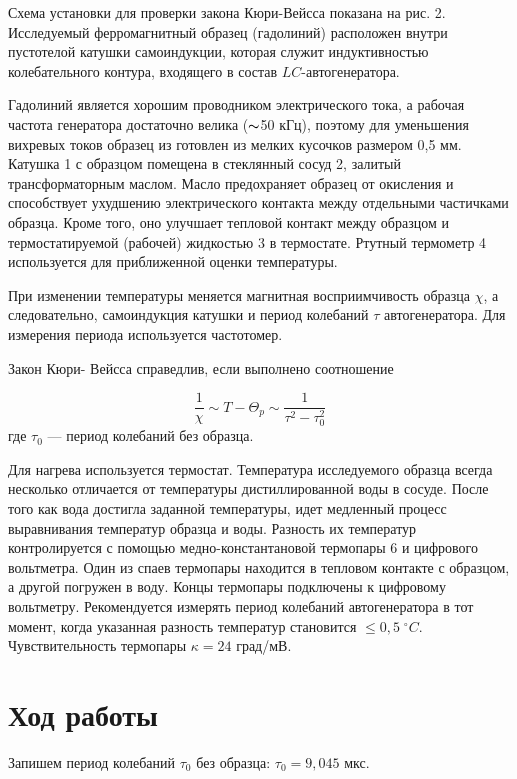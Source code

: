 \documentclass[a4paper,12pt]{article} %
\begin{document}
Схема установки для проверки закона Кюри-Вейсса показана на рис. 2. Исследуемый ферромагнитный образец (гадолиний) расположен внутри пустотелой катушки самоиндукции, которая служит индуктивностью колебательного контура, входящего в состав $LC$-автогенератора. 

Гадолиний является хорошим проводником электрического тока, а рабочая частота генератора достаточно велика ($\thicksim$50 кГц), поэтому для уменьшения вихревых токов образец из готовлен из мелких кусочков размером 0,5 мм. Катушка 1 с образцом помещена в стеклянный сосуд 2, залитый трансформаторным маслом. Масло предохраняет образец от окисления и способствует ухудшению электрического контакта между отдельными частичками образца. Кроме того, оно улучшает тепловой контакт между образцом и термостатируемой (рабочей) жидкостью 3 в термостате. Ртутный термометр 4 используется для приближенной оценки температуры.


При изменении температуры меняется магнитная восприимчивость образца $ \chi $, а следовательно, самоиндукция катушки и период колебаний $ \tau $ автогенератора. Для измерения периода используется частотомер.

Закон Кюри- Вейсса справедлив, если выполнено соотношение

\begin{equation}\label{}
	\dfrac{1}{\chi} \sim T - \Theta_p \sim \dfrac{1}{\tau^2 - \tau^2_0}
\end{equation}
где $ \tau_0 $ --- период колебаний без образца. 

Для нагрева используется термостат. Температура исследуемого образца всегда несколько отличается от температуры дистиллированной воды в сосуде. После того как вода достигла заданной температуры, идет медленный процесс выравнивания температур образца и воды. Разность их температур контролируется с помощью медно-константановой термопары 6 и цифрового вольтметра. Один из спаев термопары находится в тепловом контакте с образцом, а другой погружен в воду. Концы термопары подключены к цифровому вольтметру. Рекомендуется измерять период колебаний автогенератора в тот момент, когда указанная разность температур становится $  \leqslant 0,5 \;^\circ C $. Чувствительность термопары $ \kappa = 24 $ град/мВ.



\section*{Ход работы}

Запишем период колебаний $\tau_0$ без образца: $\tau_0 = 9,045$ мкс.
\end{document}
